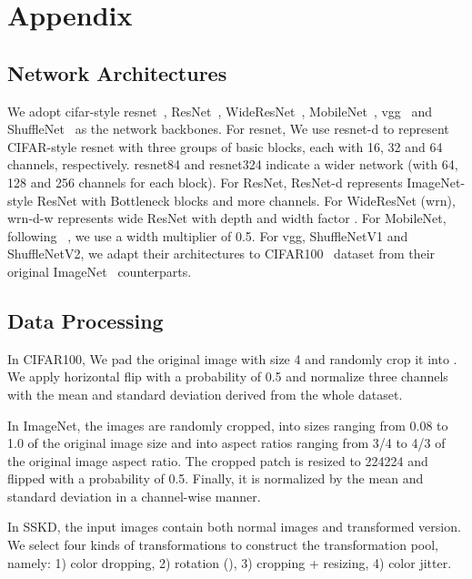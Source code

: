 \documentclass[runningheads]{llncs}
\begin{document}
\clearpage



\newpage
\section{Appendix}

\subsection{Network Architectures}

We adopt cifar-style resnet~\cite{resnet}, ResNet~\cite{resnet}, WideResNet~\cite{wrn}, MobileNet~\cite{mobilenet}, vgg~\cite{vgg} and ShuffleNet~\cite{shufflenetv2,shufflenet} as the network backbones.
For resnet, We use resnet-d to represent CIFAR-style resnet with three groups of basic blocks, each with 16, 32 and 64 channels, respectively. resnet84 and resnet324 indicate a  wider network (with 64, 128 and 256 channels for each block).
For ResNet, ResNet-d represents ImageNet-style ResNet with Bottleneck blocks and more channels.
For WideResNet (wrn), wrn-d-w represents wide ResNet with depth  and width factor . 
For MobileNet, following ~\cite{crd}, we use a width multiplier of 0.5.
For vgg, ShuffleNetV1 and ShuffleNetV2, we adapt their architectures to CIFAR100~\cite{cifar100} dataset from their original ImageNet~\cite{imagenet} counterparts.


\subsection{Data Processing}

In CIFAR100, We pad the original image with size 4 and randomly crop it into . We apply horizontal flip with a probability of 0.5 and normalize three channels with the mean and standard deviation derived from the whole dataset.

In ImageNet, the images are randomly cropped, into sizes ranging from 0.08 to 1.0 of the original image size and into aspect ratios ranging from 3/4 to 4/3 of the original image aspect ratio. The cropped patch is resized to 224224 and flipped with a probability of 0.5. Finally, it is normalized by the mean and standard deviation in a channel-wise manner.

\label{sec:trans}
In SSKD, the input images contain both normal images and transformed version. We select four kinds of transformations to construct the transformation pool, namely: 1) color dropping, 2) rotation (), 3) cropping + resizing, 4) color jitter. 
\end{document}
